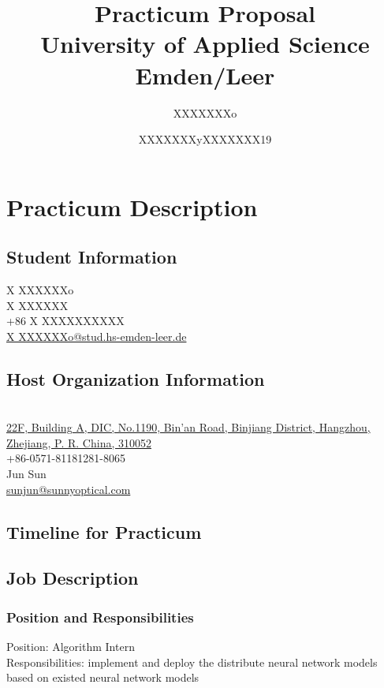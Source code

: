 \documentclass[12pt,a4paper]{article}
\title{	
	\textbf{Practicum Proposal\\
	}
	University of Applied Science \\Emden/Leer
}
\author{XXXXXXXo}
\date{XXXXXXXyXXXXXXX19}
\begin{document}
	\maketitle
	\newpage
	\tableofcontents
	\newpage
	\section{Practicum Description}
	\subsection{Student Information}
	 X
XXXXXXo\\
	 X
XXXXXX\\
	 +86 X
XXXXXXXXXX\\
	 \href{mailto:X
XXXXXXo@stud.hs-emden-leer.de}{X
XXXXXXo@stud.hs-emden-leer.de}\\
	\subsection{Host Organization Information}
	 \\
	 \href{https://j.map.baidu.com/-5172}{22F, Building A, DIC, No.1190, Bin'an Road, Binjiang District, Hangzhou, Zhejiang, P. R. China, 310052}\\
	 +86-0571-81181281-8065 \\
	 Jun Sun\\
	 \href{mailto:sunjun@sunnyoptical.com}{sunjun@sunnyoptical.com}\\
	\subsection{Timeline for Practicum}
	\subsection{Job Description}
	\subsubsection{Position and Responsibilities}
	Position: Algorithm Intern \\
	Responsibilities: implement and deploy the distribute neural network models based on existed neural network models
\end{document}

